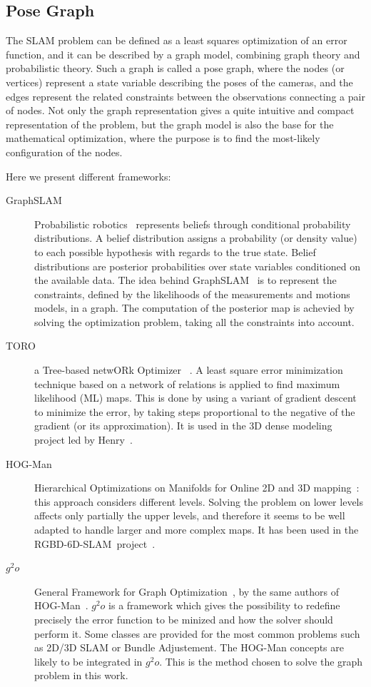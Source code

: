 \subsection{Pose Graph}

The \gls{SLAM} problem can be defined as a least squares optimization of an error function, and it can be described by a graph model, combining graph theory and probabilistic theory. Such a graph is called a pose graph, where the nodes (or vertices) represent a state variable describing the poses of the cameras, and the edges represent the related constraints between the observations connecting a pair of nodes. Not only the graph representation gives a quite intuitive and compact representation of the problem, but the graph model is also the base for the mathematical optimization, where the purpose is to find the most-likely configuration of the nodes.

Here we present different frameworks:

\begin{description}
\item[GraphSLAM] Probabilistic robotics~\cite{Thrun_2005} represents beliefs through conditional probability distributions. A belief distribution assigns a probability (or density value) to each possible hypothesis with regards to the true state. Belief distributions are posterior probabilities over state variables conditioned on the available data. The idea behind GraphSLAM~\cite{Thrun05_GraphSLAM} is to represent the constraints, defined by the likelihoods of the measurements and motions models, in a graph. The computation of the posterior map is achevied by solving the optimization problem, taking all the constraints into account.
\item[TORO] a Tree-based netwORk Optimizer ~\cite{grisetti07rss}. A least square error minimization technique based on a network of relations is applied to find maximum likelihood (ML) maps. This is done by using a variant of gradient descent to minimize the error, by taking steps proportional to the negative of the gradient (or its approximation). It is used in the 3D dense modeling project led by Henry~\cite{Henry_RGBD_2010}.
\item[HOG-Man] Hierarchical Optimizations on Manifolds for Online 2D and 3D mapping~\cite{hogman_2010}: this approach considers different levels. Solving the problem on lower levels affects only partially the upper levels, and therefore it seems to be well adapted to handle larger and more complex maps. It has been used in the RGBD-6D-SLAM~project~\cite{engelhard11euron-workshop}.
\item[$g^2o$] General Framework for Graph Optimization~\cite{g2o_2011}, by the same authors of HOG-Man~\cite{hogman_2010}. $g^2o$ is a framework which gives the possibility to redefine precisely the error function to be minized and how the solver should perform it. Some classes are provided for the most common problems such as 2D/3D \gls{SLAM} or Bundle Adjustement. The HOG-Man concepts are likely to be integrated in $g^2o$. This is the method chosen to solve the graph problem in this work.
\end{description}

